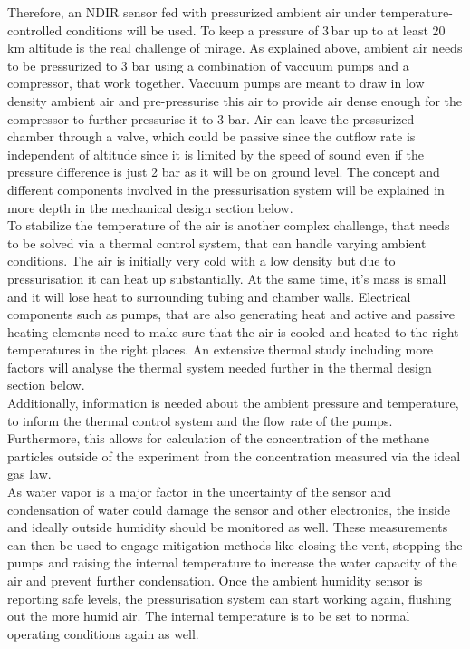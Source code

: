 \documentclass[
  a4paper,
  11pt,
  openany,
  parskip,
  toc=totoc,
  listof=totoc,
  bibliography=totoc
]{scrreprt}
\begin{document}
Therefore, an NDIR sensor fed with pressurized ambient air under temperature-controlled conditions will be used. To keep a pressure of 3\,bar up to at least 20\,km altitude is the real challenge of \gls{mirage}. As explained above, ambient air needs to be pressurized to 3 bar using a combination of vaccuum pumps and a compressor, that work together. Vaccuum pumps are meant to draw in low density ambient air and pre-pressurise this air to provide air dense enough for the compressor to further pressurise it to 3 bar. Air can leave the pressurized chamber through a valve, which could be passive since the outflow rate is independent of altitude since it is limited by the speed of sound even if the pressure difference is just 2 bar as it will be on ground level. The concept and different components involved in the pressurisation system will be explained in more depth in the mechanical design section below. \\
To stabilize the temperature of the air is another complex challenge, that needs to be solved via a thermal control system, that can handle varying ambient conditions. The air is initially very cold with a low density but due to pressurisation it can heat up substantially. At the same time, it's mass is small and it will lose heat to surrounding tubing and chamber walls. Electrical components such as pumps, that are also generating heat and active and passive heating elements need to make sure that the air is cooled and heated to the right temperatures in the right places. An extensive thermal study including more factors will analyse the thermal system needed further in the thermal design section below.\\
Additionally, information is needed about the ambient pressure and temperature, to inform the thermal control system and the flow rate of the pumps. Furthermore, this allows for calculation of the concentration of the methane particles outside of the experiment from the concentration measured via the ideal gas law.\\
As water vapor is a major factor in the uncertainty of the sensor and condensation of water could damage the sensor and other electronics, the inside and ideally outside humidity should be monitored as well.
These measurements can then be used to engage mitigation methods like closing the vent, stopping the pumps and raising the internal temperature to increase the water capacity of the air and prevent further condensation. Once the ambient humidity sensor is reporting safe levels, the pressurisation system can start working again, flushing out the more humid air. The internal temperature is to be set to normal operating conditions again as well. \\
\end{document}
